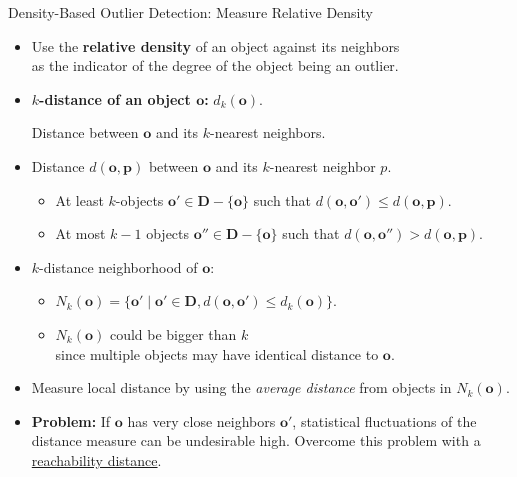 \begin{frame}{Density-Based Outlier Detection: Measure Relative Density}
	\begin{itemize}
		\item Use the \textbf{relative density} of an object against its neighbors \\
		      as the indicator of the degree of the object being an outlier.
		\item \textbf{{\color{airforceblue}$k$-distance} of an object $\mathbf{o}$:} $d_k(\mathbf{o})$.

		      Distance between $\mathbf{o}$ and its $k$-nearest neighbors.
		\item Distance $d(\mathbf{o}, \mathbf{p})$ between $\mathbf{o}$ and its $k$-nearest neighbor $p$.
		      \begin{itemize}
			      \item At least $k$-objects $\textbf{o}' \in \mathbf{D} - \{\mathbf{o}\}$
			            such that $d(\mathbf{o}, \mathbf{o}') \leq d(\mathbf{o}, \mathbf{p})$.
			      \item At most $k-1$ objects $\mathbf{o}'' \in \mathbf{D} - \{\mathbf{o}\}$
			            such that $d(\mathbf{o}, \mathbf{o}'') > d(\mathbf{o}, \mathbf{p})$.
		      \end{itemize}
		\item $k$-distance neighborhood of $\mathbf{o}$:
		      \begin{itemize}
			      \item $N_k(\mathbf{o}) = \{\mathbf{o}' \; \vert \; \mathbf{o}' \in \mathbf{D}, d(\mathbf{o}, \mathbf{o}') \leq d_k(\mathbf{o})\}$.
			      \item $N_k(\mathbf{o})$ could be bigger than $k$ \\
			            since multiple objects may have identical distance to $\mathbf{o}$.
		      \end{itemize}
		\item Measure local distance by using the \textit{average distance} from objects in $N_k(\mathbf{o})$.
		\item \textbf{Problem:} If $\mathbf{o}$ has very close neighbors $\mathbf{o}'$, statistical fluctuations of the distance measure can be undesirable high. Overcome this problem with a \underline{reachability distance}.
	\end{itemize}
\end{frame}


